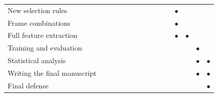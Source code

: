 \begin{table}[t]
\begin{tabular}{L{4.85cm}*{3}{>{\centering\arraybackslash}p{0.38cm}}*{11}{c}}
      New selection rules & & & & & & & & & & & $\bullet$ & & & \\
      Frame combinations & & & & & & & & & & & $\bullet$ & & & \\
      Full feature extraction & & & & & & & & & & & $\bullet$ & $\bullet$ & & \\
      Training and evaluation & & & & & & & & & & & & & $\bullet$ & \\
      Statistical analysis & & & & & & & & & & & & & $\bullet$ & $\bullet$ \\
      Writing the final manuscript & & & & & & & & & & & & & $\bullet$ & $\bullet$ \\
      Final defense & & & & & & & & & & & & & & $\bullet$ \\
      \bottomrule
   \end{tabular}
\end{table}
